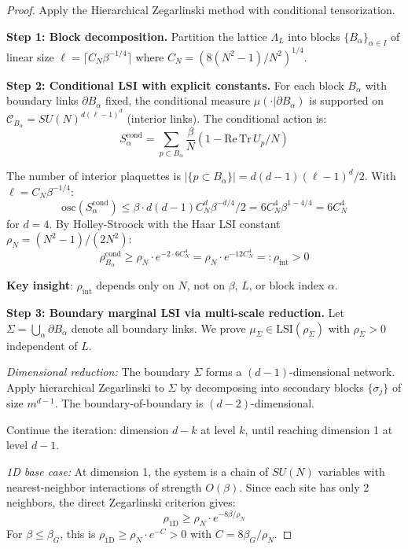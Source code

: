 \begin{proof}
Apply the Hierarchical Zegarlinski method with conditional tensorization.

\textbf{Step 1: Block decomposition.}
Partition the lattice $\Lambda_L$ into blocks $\{B_\alpha\}_{\alpha \in I}$ of linear 
size $\ell = \lceil C_N \beta^{-1/4} \rceil$ where $C_N = (8(N^2-1)/N^2)^{1/4}$.

\textbf{Step 2: Conditional LSI with explicit constants.}
For each block $B_\alpha$ with boundary links $\partial B_\alpha$ fixed, the conditional 
measure $\mu(\cdot | \partial B_\alpha)$ is supported on $\mathcal{C}_{B_\alpha} = SU(N)^{d(\ell-1)^d}$ 
(interior links). The conditional action is:
\[
S_\alpha^{\mathrm{cond}} = \sum_{p \subset B_\alpha} \frac{\beta}{N}(1 - \mathrm{Re}\,\mathrm{Tr}\,U_p/N)
\]

The number of interior plaquettes is $|\{p \subset B_\alpha\}| = d(d-1)(\ell-1)^d/2$.
With $\ell = C_N \beta^{-1/4}$:
\[
\mathrm{osc}(S_\alpha^{\mathrm{cond}}) \leq \beta \cdot d(d-1)C_N^d \beta^{-d/4}/2 = 6 C_N^4 \beta^{1-4/4} = 6 C_N^4
\]
for $d = 4$. By Holley-Stroock with the Haar LSI constant $\rho_N = (N^2-1)/(2N^2)$:
\[
\rho_{B_\alpha}^{\mathrm{cond}} \geq \rho_N \cdot e^{-2 \cdot 6 C_N^4} = \rho_N \cdot e^{-12 C_N^4} =: \rho_{\mathrm{int}} > 0
\]

\textbf{Key insight}: $\rho_{\mathrm{int}}$ depends only on $N$, not on $\beta$, $L$, or block index $\alpha$.

\textbf{Step 3: Boundary marginal LSI via multi-scale reduction.}
Let $\Sigma = \bigcup_\alpha \partial B_\alpha$ denote all boundary links. We prove 
$\mu_\Sigma \in \mathrm{LSI}(\rho_\Sigma)$ with $\rho_\Sigma > 0$ independent of $L$.

\textit{Dimensional reduction:} The boundary $\Sigma$ forms a $(d-1)$-dimensional 
network. Apply hierarchical Zegarlinski to $\Sigma$ by decomposing into secondary 
blocks $\{\sigma_j\}$ of size $m^{d-1}$. The boundary-of-boundary is $(d-2)$-dimensional.

Continue the iteration: dimension $d-k$ at level $k$, until reaching dimension 1 
at level $d-1$.

\textit{1D base case:} At dimension 1, the system is a chain of $SU(N)$ variables with 
nearest-neighbor interactions of strength $O(\beta)$. Since each site has only 2 neighbors, 
the direct Zegarlinski criterion gives:
\[
\rho_{\mathrm{1D}} \geq \rho_N \cdot e^{-8\beta/\rho_N}
\]
For $\beta \leq \beta_G$, this is $\rho_{\mathrm{1D}} \geq \rho_N \cdot e^{-C} > 0$ with $C = 8\beta_G/\rho_N$.


\end{proof}
